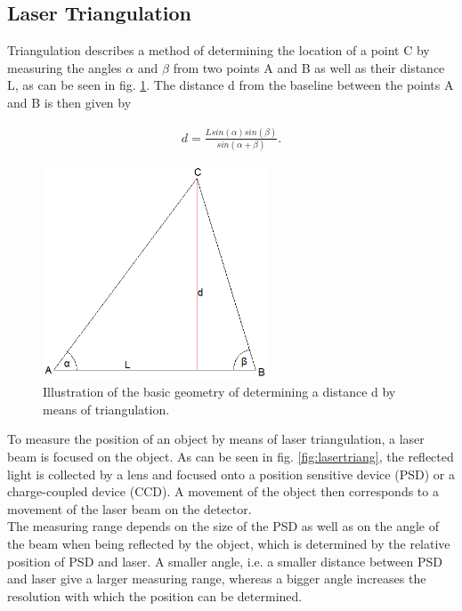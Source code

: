 \subsection{\label{triang}Laser Triangulation}

Triangulation describes a method of determining the location of a point C by measuring the angles $\alpha$ and $\beta$ from two points A and B as well as their distance L, as can be seen in fig. \ref{fig:triang}. The distance d from the baseline between the points A and B is then given by

\begin{eqnarray}
d = \frac{L sin(\alpha)sin(\beta)}{sin(\alpha + \beta)}.
\end{eqnarray}

\begin{figure}[H]
	\centering
	\includegraphics[angle=0,width=0.6\textwidth]{img/triang}
	\caption{Illustration of the basic geometry of determining a distance d by means of triangulation.}
	\label{fig:triang}
\end{figure}

To measure the position of an object by means of laser triangulation, a laser beam is focused on the object. As can be seen in fig. \ref{fig:lasertriang}, the reflected light is collected by a lens and focused onto a position sensitive device (PSD) or a charge-coupled device (CCD). A movement of the object then corresponds to a movement of the laser beam on the detector.\\

The measuring range depends on the size of the PSD as well as on the angle of the beam when being reflected by the object, which is determined by the relative position of PSD and laser. A smaller angle, i.e. a smaller distance between PSD and laser give a larger measuring range, whereas a bigger angle increases the resolution with which the position can be determined.

